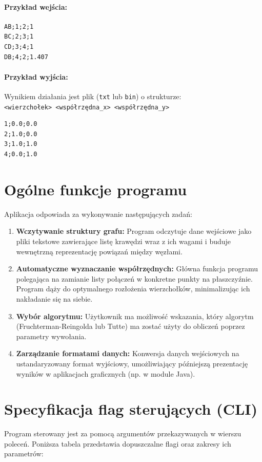 \documentclass[12pt,a4paper]{article}
\begin{document}
\paragraph{Przykład wejścia:}
\begin{verbatim}
AB;1;2;1
BC;2;3;1
CD;3;4;1
DB;4;2;1.407
\end{verbatim}

\paragraph{Przykład wyjścia:}
Wynikiem działania jest plik (\texttt{txt} lub \texttt{bin}) o strukturze: \\
\texttt{<wierzchołek> <współrzędna\_x> <współrzędna\_y>}
\begin{verbatim}
1;0.0;0.0
2;1.0;0.0
3;1.0;1.0
4;0.0;1.0
\end{verbatim}

\section{Ogólne funkcje programu}
Aplikacja odpowiada za wykonywanie następujących zadań:

\begin{enumerate}
    \item \textbf{Wczytywanie struktury grafu:} Program odczytuje dane wejściowe jako pliki tekstowe zawierające listę krawędzi wraz z ich wagami i buduje wewnętrzną reprezentację powiązań między węzłami.
    \item \textbf{Automatyczne wyznaczanie współrzędnych:} Główna funkcja programu polegająca na zamianie listy połączeń w konkretne punkty na płaszczyźnie. Program dąży do optymalnego rozłożenia wierzchołków, minimalizując ich nakładanie się na siebie.
    \item \textbf{Wybór algorytmu:} Użytkownik ma możliwość wskazania, który algorytm (Fruchterman-Reingolda lub Tutte) ma zostać użyty do obliczeń poprzez parametry wywołania.
    \item \textbf{Zarządzanie formatami danych:} Konwersja danych wejściowych na ustandaryzowany format wyjściowy, umożliwiający późniejszą prezentację wyników w aplikacjach graficznych (np. w module Java).
\end{enumerate}
\section{Specyfikacja flag sterujących (CLI)}

Program sterowany jest za pomocą argumentów przekazywanych w wierszu poleceń. Poniższa tabela przedstawia dopuszczalne flagi oraz zakresy ich parametrów:
\end{document}
